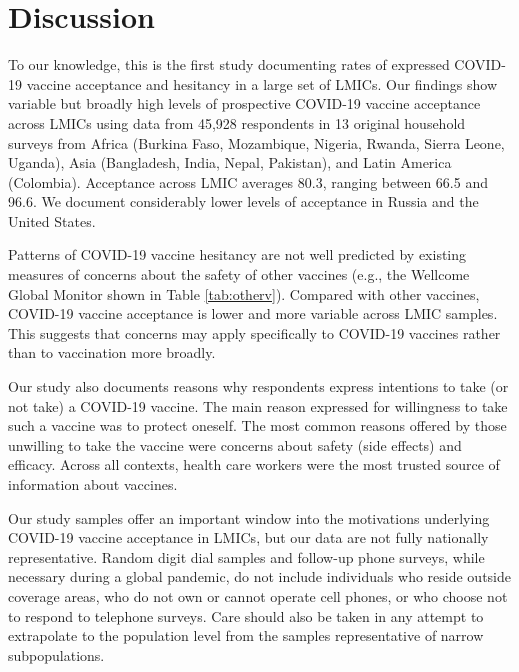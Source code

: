 \documentclass[
  12pt,
]{article}
\begin{document}
\hypertarget{discussion}{%
\section*{Discussion}\label{discussion}}

To our knowledge, this is the first study documenting rates of expressed COVID-19 vaccine acceptance and hesitancy in a large set of LMICs. Our findings show variable but broadly high levels of prospective COVID-19 vaccine acceptance across LMICs using data from 45,928 respondents in 13 original household surveys from Africa (Burkina Faso, Mozambique, Nigeria, Rwanda, Sierra Leone, Uganda), Asia (Bangladesh, India, Nepal, Pakistan), and Latin America (Colombia). Acceptance across LMIC averages 80.3, ranging between 66.5 and 96.6. We document considerably lower levels of acceptance in Russia and the United States.

Patterns of COVID-19 vaccine hesitancy are not well predicted by existing measures of concerns about the safety of other vaccines (e.g., the Wellcome Global Monitor shown in Table \ref{tab:otherv}). Compared with other vaccines, COVID-19 vaccine acceptance is lower and more variable across LMIC samples. This suggests that concerns may apply specifically to COVID-19 vaccines rather than to vaccination more broadly.

Our study also documents reasons why respondents express intentions to take (or not take) a COVID-19 vaccine. The main reason expressed for willingness to take such a vaccine was to protect oneself. The most common reasons offered by those unwilling to take the vaccine were concerns about safety (side effects) and efficacy. Across all contexts, health care workers were the most trusted source of information about vaccines.

Our study samples offer an important window into the motivations underlying COVID-19 vaccine acceptance in LMICs, but our data are not fully nationally representative. Random digit dial samples and follow-up phone surveys, while necessary during a global pandemic, do not include individuals who reside outside coverage areas, who do not own or cannot operate cell phones, or who choose not to respond to telephone surveys. Care should also be taken in any attempt to extrapolate to the population level from the samples representative of narrow subpopulations.
\end{document}

